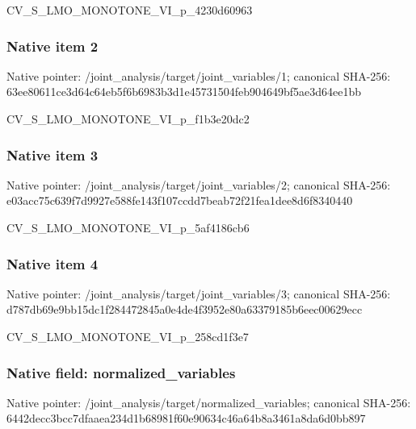 \documentclass[10pt,a4paper]{article}
\begin{document}
\begingroup\raggedright\sloppy CV\_\allowbreak{}S\_\allowbreak{}LMO\_\allowbreak{}MONOTONE\_\allowbreak{}VI\_\allowbreak{}p\_\allowbreak{}4230d60963\par\endgroup

\subsubsection{Native item 2}
Native pointer: /joint\_\allowbreak{}analysis/target/joint\_\allowbreak{}variables/1; canonical SHA-256: 63ee80611ce3d64c64eb5f6b6983b3d1e45731504feb904649bf5ae3d64ee1bb

\begingroup\raggedright\sloppy CV\_\allowbreak{}S\_\allowbreak{}LMO\_\allowbreak{}MONOTONE\_\allowbreak{}VI\_\allowbreak{}p\_\allowbreak{}f1b3e20dc2\par\endgroup

\subsubsection{Native item 3}
Native pointer: /joint\_\allowbreak{}analysis/target/joint\_\allowbreak{}variables/2; canonical SHA-256: e03acc75c639f7d9927e588fe143f107ccdd7beab72f21fea1dee8d6f8340440

\begingroup\raggedright\sloppy CV\_\allowbreak{}S\_\allowbreak{}LMO\_\allowbreak{}MONOTONE\_\allowbreak{}VI\_\allowbreak{}p\_\allowbreak{}5af4186cb6\par\endgroup

\subsubsection{Native item 4}
Native pointer: /joint\_\allowbreak{}analysis/target/joint\_\allowbreak{}variables/3; canonical SHA-256: d787db69e9bb15dc1f284472845a0e4de4f3952e80a63379185b6eec00629ecc

\begingroup\raggedright\sloppy CV\_\allowbreak{}S\_\allowbreak{}LMO\_\allowbreak{}MONOTONE\_\allowbreak{}VI\_\allowbreak{}p\_\allowbreak{}258cd1f3e7\par\endgroup

\subsubsection{Native field: normalized\_\allowbreak{}variables}
Native pointer: /joint\_\allowbreak{}analysis/target/normalized\_\allowbreak{}variables; canonical SHA-256: 6442decc3bcc7dfaaea234d1b68981f60e90634c46a64b8a3461a8da6d0bb897
\end{document}
